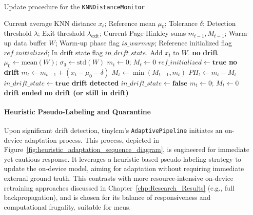 \begin{algorithm}[htbp]
  \caption{Update procedure for the \texttt{KNNDistanceMonitor}}
  \label{alg:knn_distance_monitor_update}
  \begin{algorithmic}[1]
    \Require Current average KNN distance $x_t$; Reference mean $\mu_0$; Tolerance $\delta$; Detection threshold $\lambda$; Exit threshold $\lambda_{\mathrm{exit}}$; Current Page-Hinkley sums $m_{t-1}, M_{t-1}$; Warm-up data buffer $W$; Warm-up phase flag $is\_warmup$; Reference initialized flag $ref\_initialized$; In drift state flag $in\_drift\_state$.
      \State Add $x_t$ to $W$.
      \State \Return \textbf{no drift}
      \State $\mu_0 \gets \mathrm{mean}(W)$; $\sigma_0 \gets \mathrm{std}(W)$ 
      \State $m_t \gets 0$; $M_t \gets 0$ 
      \State $ref\_initialized \gets \textbf{true}$
      \State \Return \textbf{no drift}
    \Else
      \State $m_t \gets m_{t-1} + (x_t - \mu_0 - \delta)$
      \State $M_t \gets \min(M_{t-1}, m_t)$
      \State $PH_t \gets m_t - M_t$
        \State $in\_drift\_state \gets \textbf{true}$
        \State \Return \textbf{drift detected}
        \State $in\_drift\_state \gets \textbf{false}$
        \State $m_t \gets 0$; $M_t \gets 0$ 
        \State \Return \textbf{drift ended}
      \Else
        \State \Return \textbf{no drift (or still in drift)}
      \EndIf
    \EndIf
  \end{algorithmic}
\end{algorithm}
\FloatBarrier

\paragraph{Heuristic Pseudo-Labeling and Quarantine}
Upon significant drift detection, \gls{tinylcm}'s \texttt{AdaptivePipeline} initiates an on-device adaptation process. This process, depicted in Figure~\ref{fig:heuristic_adaptation_sequence_diagram}, is engineered for immediate yet cautious response. It leverages a heuristic-based pseudo-labeling strategy to update the on-device model, aiming for adaptation without requiring immediate external ground truth. This contrasts with more resource-intensive on-device retraining approaches discussed in Chapter~\ref{chp:Research_Results} (e.g., full backpropagation), and is chosen for its balance of responsiveness and computational frugality, suitable for \glspl{mcu}.

